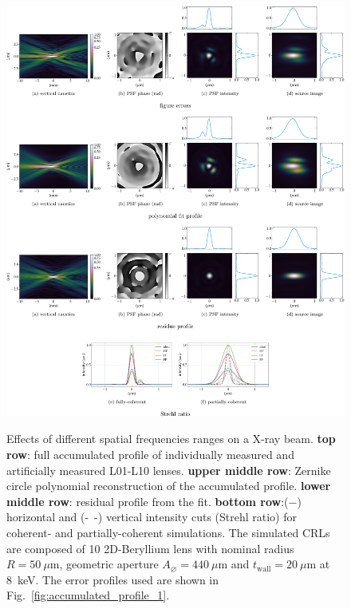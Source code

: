 \begin{refsection}
\begin{figure}[ht]
        \centering
        {\includegraphics[width=1\linewidth]{figures/ch05/CDnFF_LF_HH.pdf}}
        \caption[Effects of different spatial frequencies ranges on a X-ray beam]{Effects of different spatial frequencies ranges on a X-ray beam. \textbf{top row}: full accumulated profile of individually measured and artificially measured L01-L10 lenses. \textbf{upper middle row}: Zernike circle polynomial reconstruction of the accumulated profile. \textbf{lower middle row}: residual profile from the fit. \textbf{bottom row}:($-$) horizontal and (-~-) vertical intensity cuts (Strehl ratio) for coherent- and partially-coherent simulations. The simulated CRLs are composed of 10 2D-Beryllium lens with nominal radius $R=50~\mu\text{m}$, geometric aperture $A_{\diameter}=440~\mu\text{m}$ and $t_\text{wall}=20~\mu$m at 8~keV. The error profiles used are shown in Fig.~\ref{fig:accumulated_profile_1}.}\label{fig:CDnFF_LF_HH}
\end{figure}


\end{refsection}
